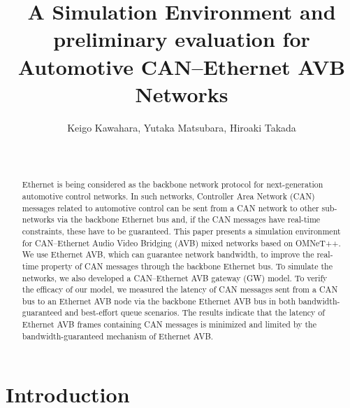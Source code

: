 \documentclass{sig-alternate}
\begin{document}
\title{A Simulation Environment and preliminary evaluation for
Automotive CAN--Ethernet AVB Networks}


 \author{
Keigo Kawahara, Yutaka Matsubara, Hiroaki Takada\\
       \\
       \\
}

\maketitle
\begin{abstract}
Ethernet is being considered as the backbone network protocol for
next-generation automotive control networks. In such networks,
Controller Area Network (CAN) messages related to automotive control can
be sent from a CAN network to other sub-networks via the backbone
Ethernet bus and, if the CAN messages have real-time constraints, these
have to be guaranteed. This paper presents a simulation environment for
CAN--Ethernet Audio Video Bridging (AVB) mixed networks based on
OMNeT++. We use Ethernet AVB, which can guarantee network bandwidth, to
improve the real-time property of CAN messages through the backbone
Ethernet bus. To simulate the networks, we also developed a
CAN--Ethernet AVB gateway (GW) model. To verify the efficacy of our
model, we measured the latency of CAN messages sent from a CAN bus to an
Ethernet AVB node via the backbone Ethernet AVB bus in both
bandwidth-guaranteed and best-effort queue scenarios. The results
indicate that the latency of Ethernet AVB frames containing CAN messages
is minimized and limited by the bandwidth-guaranteed mechanism of
Ethernet AVB.
\end{abstract}




\section{Introduction}
\end{document}
